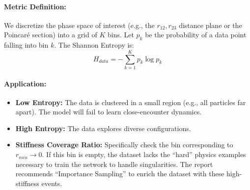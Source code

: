 \paragraph{Metric Definition:}
We discretize the phase space of interest (e.g., the $r_{12}, r_{23}$ distance plane or the Poincaré section) into a grid of $K$ bins. Let $p_k$ be the probability of a data point falling into bin $k$. The Shannon Entropy is:
\begin{equation}
    H_{data} = - \sum_{k=1}^{K} p_k \log p_k
\end{equation}

\paragraph{Application:}
\begin{itemize}
    \item \textbf{Low Entropy:} The data is clustered in a small region (e.g., all particles far apart). The model will fail to learn close-encounter dynamics.
    \item \textbf{High Entropy:} The data explores diverse configurations.
    \item \textbf{Stiffness Coverage Ratio:} Specifically check the bin corresponding to $r_{min} \to 0$. If this bin is empty, the dataset lacks the ``hard'' physics examples necessary to train the network to handle singularities. The report recommends ``Importance Sampling'' to enrich the dataset with these high-stiffness events.
\end{itemize}

